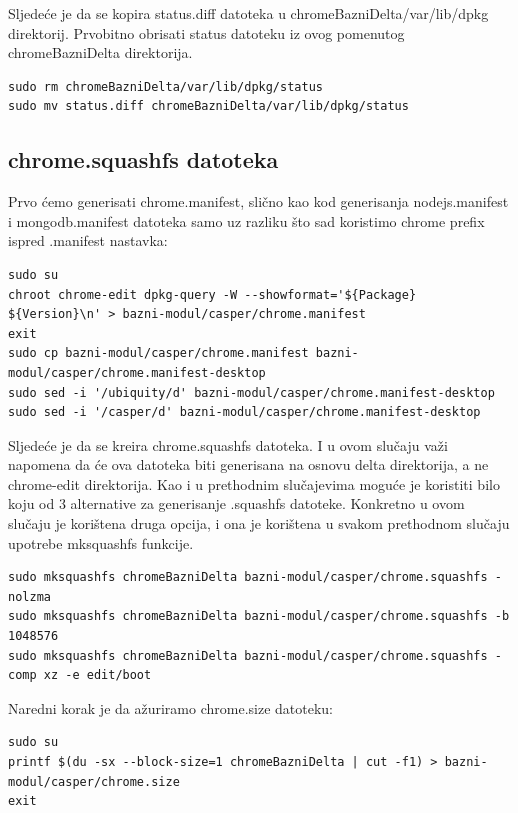 \documentclass[12pt,vi]{mitthesis}
\begin{document}
Sljedeće je da se kopira status.diff datoteka u chromeBazniDelta/var/lib/dpkg direktorij. Prvobitno obrisati status datoteku iz ovog pomenutog chromeBazniDelta direktorija.\\
\begin{lstlisting}[style=BashInputStyle]
sudo rm chromeBazniDelta/var/lib/dpkg/status
sudo mv status.diff chromeBazniDelta/var/lib/dpkg/status
\end{lstlisting}

\subsection*{chrome.squashfs datoteka}
\indent
Prvo ćemo generisati chrome.manifest, slično kao kod generisanja nodejs.manifest i mongodb.manifest datoteka samo uz razliku što sad koristimo chrome prefix ispred .manifest nastavka:
\begin{lstlisting}[style=BashInputStyle]
sudo su
chroot chrome-edit dpkg-query -W --showformat='${Package} ${Version}\n' > bazni-modul/casper/chrome.manifest
exit
sudo cp bazni-modul/casper/chrome.manifest bazni-modul/casper/chrome.manifest-desktop
sudo sed -i '/ubiquity/d' bazni-modul/casper/chrome.manifest-desktop
sudo sed -i '/casper/d' bazni-modul/casper/chrome.manifest-desktop
\end{lstlisting}
\indent
Sljedeće je da se kreira chrome.squashfs datoteka. I u ovom slučaju važi napomena da će ova datoteka biti generisana na osnovu delta direktorija, a ne chrome-edit direktorija. Kao i u prethodnim slučajevima moguće je koristiti bilo koju od 3 alternative za generisanje .squashfs datoteke. Konkretno u ovom slučaju je korištena druga opcija, i ona je korištena u svakom prethodnom slučaju upotrebe mksquashfs funkcije.
\begin{lstlisting}[style=BashInputStyle]
sudo mksquashfs chromeBazniDelta bazni-modul/casper/chrome.squashfs -nolzma 
sudo mksquashfs chromeBazniDelta bazni-modul/casper/chrome.squashfs -b 1048576
sudo mksquashfs chromeBazniDelta bazni-modul/casper/chrome.squashfs -comp xz -e edit/boot
\end{lstlisting}

\noindent
Naredni korak je da ažuriramo chrome.size datoteku:
\begin{lstlisting}[style=BashInputStyle]
sudo su
printf $(du -sx --block-size=1 chromeBazniDelta | cut -f1) > bazni-modul/casper/chrome.size
exit
\end{lstlisting}
\end{document}
